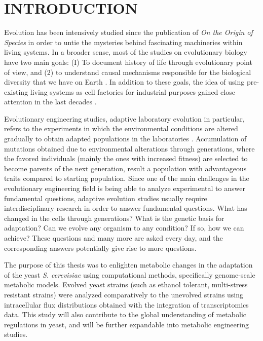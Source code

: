 \chapter{INTRODUCTION}
Evolution has been intensively studied since the publication of \emph{On the Origin of Species} in order to untie the mysteries behind fascinating machineries within living systems. In a broader sense, most of the studies on evolutionary biology have two main goals: (I) To document history of life through evolutionary point of view, and (2) to understand causal mechanisms responsible for the biological diversity that we have on Earth \cite{futuyma2001evolution, hird2017evolutionary}. In addition to these goals, the idea of using pre-existing living systems as cell factories for industrial purposes gained close attention in the last decades \cite{nielsen2016engineering}.

Evolutionary engineering studies, adaptive laboratory evolution in particular, refers to the experiments in which the environmental conditions are altered gradually to obtain adapted populations in the laboratories \cite{garland2009experimental}. Accumulation of mutations obtained due to environmental alterations through generations, where the favored individuals (mainly the ones with increased fitness) are selected to become parents of the next generation, result a population with advantageous traits compared to starting population. Since one of the main challenges in the evolutionary engineering field is being able to analyze experimental to answer fundamental questions, adaptive evolution studies usually require interdisciplinary research in order to answer fundamental questions. What has changed in the cells through generations? What is the genetic basis for adaptation? Can we evolve any organism to any condition? If so, how we can achieve? These questions and many more are asked every day, and the corresponding answers potentially give rise to more questions.

The purpose of this thesis was to enlighten metabolic changes in the adaptation of the yeast \emph{S. cerevisiae} using computational methods, specifically genome-scale metabolic models. Evolved yeast strains (such as ethanol tolerant, multi-stress resistant strains) were analyzed comparatively to the unevolved strains using intracellular flux distributions obtained with the integration of transcriptomics data. This study will also contribute to the global understanding of metabolic regulations in yeast, and will be further expandable into metabolic engineering studies.

